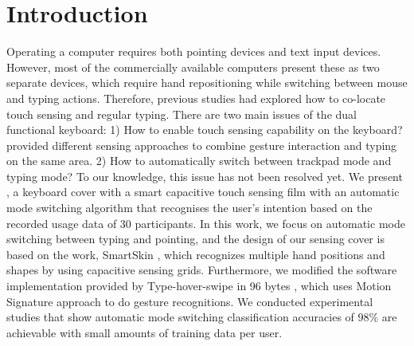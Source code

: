 \section{Introduction}
Operating a computer requires both pointing devices and text input devices.
However, most of the commercially available computers present these as two separate devices, which require hand repositioning while switching between mouse and typing actions.
Therefore, previous studies had explored how to co-locate touch sensing and regular typing. 
There are two main issues of the dual functional keyboard: 1) How to enable touch sensing capability on the keyboard?  \cite{TouchNType,DTGS,96bytes} provided different sensing approaches to combine gesture interaction and typing on the same area. 2) How to automatically switch between trackpad mode and typing mode? To our knowledge, this issue has not been resolved yet. We present \papertitle, a keyboard cover with a smart capacitive touch sensing film with an automatic mode switching algorithm that recognises the user's intention based on the recorded usage data of 30 participants.
In this work, we focus on automatic mode switching between typing and pointing, and the design of our sensing cover is based on the work, SmartSkin \cite{smartskin}, which recognizes multiple hand positions and shapes by using capacitive sensing grids. Furthermore, we modified the software implementation provided by Type-hover-swipe in 96 bytes \cite{96bytes}, which uses Motion Signature approach \cite{96bytes} to do gesture recognitions. We conducted experimental studies that show automatic mode switching classification accuracies of 98\% are achievable with small amounts of training data per user.
